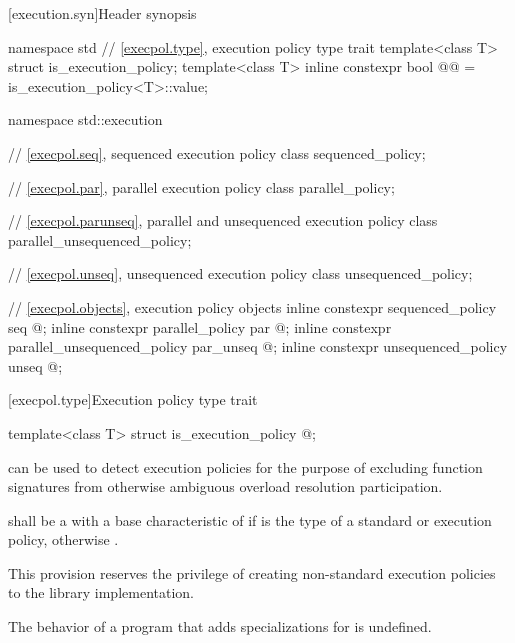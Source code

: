 [execution.syn]{Header  synopsis}

%
\begin{codeblock}
namespace std {
  // \ref{execpol.type}, execution policy type trait
  template<class T> struct is_execution_policy;
  template<class T> inline constexpr bool @@ = is_execution_policy<T>::value;
}

namespace std::execution {
  // \ref{execpol.seq}, sequenced execution policy
  class sequenced_policy;

  // \ref{execpol.par}, parallel execution policy
  class parallel_policy;

  // \ref{execpol.parunseq}, parallel and unsequenced execution policy
  class parallel_unsequenced_policy;

  // \ref{execpol.unseq}, unsequenced execution policy
  class unsequenced_policy;

  // \ref{execpol.objects}, execution policy objects
  inline constexpr sequenced_policy            seq{ @\unspec@ };
  inline constexpr parallel_policy             par{ @\unspec@ };
  inline constexpr parallel_unsequenced_policy par_unseq{ @\unspec@ };
  inline constexpr unsequenced_policy          unseq{ @\unspec@ };
}
\end{codeblock}

[execpol.type]{Execution policy type trait}

%
\begin{itemdecl}
template<class T> struct is_execution_policy { @\seebelow@ };
\end{itemdecl}

\begin{itemdescr}
\pnum
{} can be used to detect execution policies for the
purpose of excluding function signatures from otherwise ambiguous overload
resolution participation.

\pnum
{} shall be a  with a
base characteristic of  if  is the type of a standard
or 
execution policy, otherwise .

\begin{note}
This provision reserves the privilege of creating non-standard execution
policies to the library implementation.
\end{note}

\pnum
The behavior of a program that adds specializations for
 is undefined.
\end{itemdescr}


